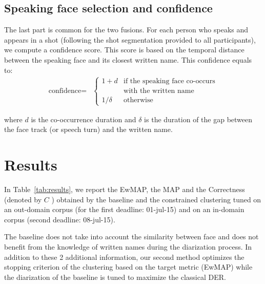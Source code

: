 \documentclass{acm_proc_article-me}
\begin{document}
\subsection{Speaking face selection and confidence}

The last part is common for the two fusions. For each person who speaks and appears in a shot (following the shot segmentation provided to all participants), we compute a confidence score. This score is based on the temporal distance between the speaking face and its closest written name. This confidence equals to:
\begin{align*}
  \text{confidence} = & \left\{
  	\begin{array}{ll}
  		1+d  & \mbox{if the speaking face co-occurs}  \\
  		 	 & \mbox{with the written name}		\\
  		1/\delta &\mbox{otherwise}
  	\end{array}
  \right.
\end{align*}

\noindent where $d$ is the co-occurrence duration and $\delta$ is the duration of the gap between the face track (or speech turn) and the written name.

\section{Results}

In Table~\ref{tab:results}, we report the EwMAP, the MAP and the Correctness (denoted by $C$ ) obtained by the baseline and the constrained clustering tuned on an out-domain corpus (for the first deadline: 01-jul-15) and on an in-domain corpus (second deadline: 08-jul-15).

The baseline does not take into account the similarity between face and does not benefit from the knowledge of written names during the diarization process. In addition to these 2 additional information, our second method optimizes the stopping criterion of the clustering based on the target metric (EwMAP) while the diarization of the baseline is tuned to maximize the classical DER.
\end{document}

